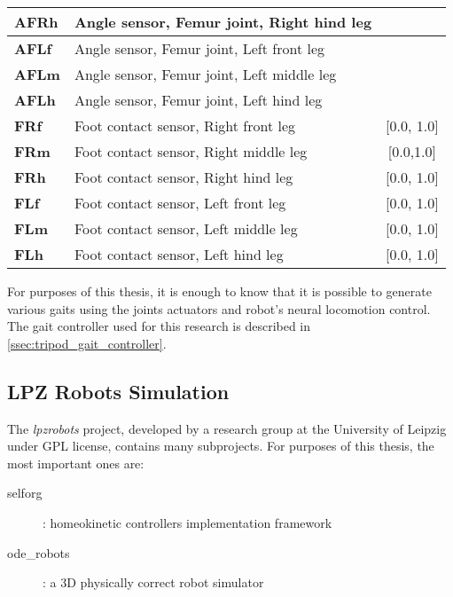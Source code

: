 \begin{table}[H]
\begin{tabular}{|l|l|c|}
\textbf{AFRh}         & Angle sensor, Femur joint, Right hind leg        &                         \\ \hline
\textbf{AFLf}         & Angle sensor, Femur joint, Left front leg        &                         \\ \hline
\textbf{AFLm}         & Angle sensor, Femur joint, Left middle leg       &                         \\ \hline
\textbf{AFLh}         & Angle sensor, Femur joint, Left hind leg         &                         \\ \hline
\textbf{FRf}          & Foot contact sensor, Right front leg             & {[}0.0, 1.0{]}          \\ \hline
\textbf{FRm}          & Foot contact sensor, Right middle leg            & {[}0.0,1.0{]}           \\ \hline
\textbf{FRh}          & Foot contact sensor, Right hind leg              & {[}0.0, 1.0{]}          \\ \hline
\textbf{FLf}          & Foot contact sensor, Left front leg              & {[}0.0, 1.0{]}          \\ \hline
\textbf{FLm}          & Foot contact sensor, Left middle leg             & {[}0.0, 1.0{]}          \\ \hline
\textbf{FLh}          & Foot contact sensor, Left hind leg               & {[}0.0, 1.0{]}          \\ \hline
\end{tabular}
\end{table}

For purposes of this thesis, it is enough to know that it is possible to generate various gaits using the joints actuators and robot's neural locomotion control. The gait controller used for this research is described in \cref{ssec:tripod_gait_controller}.

\subsection{LPZ Robots Simulation} \label{ssec:lpzrobots_sim}
The \textit{lpzrobots} project, developed by a research group at the University of Leipzig \citep{misc:lpzrobots} under GPL license, contains many subprojects. For purposes of this thesis, the most important ones are:

\begin{description}
\item[selforg] : homeokinetic controllers implementation framework
\item[ode\_robots] : a 3D physically correct robot simulator
\end{description}

